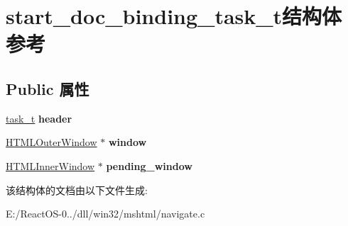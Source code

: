 \hypertarget{structstart__doc__binding__task__t}{}\section{start\+\_\+doc\+\_\+binding\+\_\+task\+\_\+t结构体 参考}
\label{structstart__doc__binding__task__t}
\subsection*{Public 属性}
\begin{DoxyCompactItemize}
\item 
\mbox{\label{structstart__doc__binding__task__t_abaafaa6d2a4fa14dc90ccdf9daea7ab9}} 
\hyperlink{structtask__t}{task\+\_\+t} {\bfseries header}
\item 
\mbox{\label{structstart__doc__binding__task__t_a1150da821de55e247e6736c22ceae360}} 
\hyperlink{struct_h_t_m_l_outer_window}{H\+T\+M\+L\+Outer\+Window} $\ast$ {\bfseries window}
\item 
\mbox{\label{structstart__doc__binding__task__t_a2c27b2d6ab917742028184e181120c1a}} 
\hyperlink{struct_h_t_m_l_inner_window}{H\+T\+M\+L\+Inner\+Window} $\ast$ {\bfseries pending\+\_\+window}
\end{DoxyCompactItemize}


该结构体的文档由以下文件生成\+:\begin{DoxyCompactItemize}
\item 
E\+:/\+React\+O\+S-\/0../dll/win32/mshtml/navigate.\+c\end{DoxyCompactItemize}
